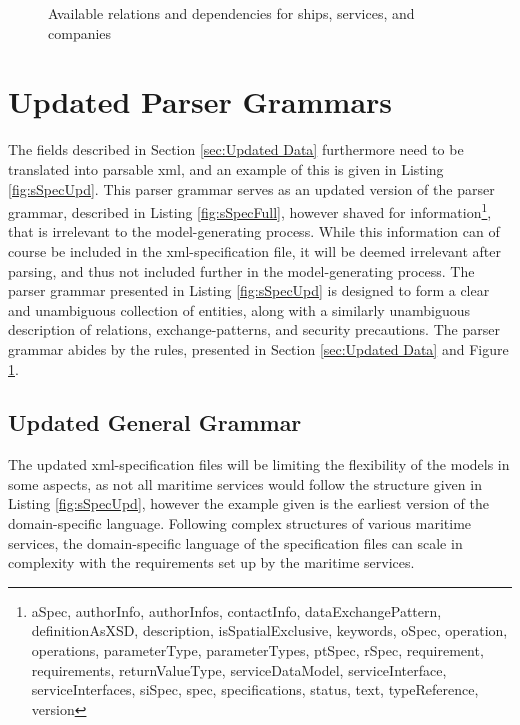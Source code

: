 \begin{figure}
	\caption{Available relations and dependencies for ships, services, and companies}
	\label{fig:entities}
\end{figure}


\section{Updated Parser Grammars}

The fields described in Section \ref{sec:Updated Data} furthermore need to be translated into parsable xml, and an example of this is given in Listing \ref{fig:sSpecUpd}. This parser grammar serves as an updated version of the parser grammar, described in Listing \ref{fig:sSpecFull}, however shaved for information\footnote{aSpec, authorInfo, authorInfos, contactInfo, dataExchangePattern, definitionAsXSD, description, isSpatialExclusive, keywords, oSpec, operation, operations, parameterType, parameterTypes, ptSpec, rSpec, requirement, requirements, returnValueType, serviceDataModel, serviceInterface, serviceInterfaces, siSpec, spec, specifications, status, text, typeReference, version}, that is irrelevant to the model-generating process. While this information can of course be included in the xml-specification file, it will be deemed irrelevant after parsing, and thus not included further in the model-generating process. The parser grammar presented in Listing \ref{fig:sSpecUpd} is designed to form a clear and unambiguous collection of entities, along with a similarly unambiguous description of relations, exchange-patterns, and security precautions. The parser grammar abides by the rules, presented in Section \ref{sec:Updated Data} and Figure \ref{fig:entities}.

\subsection{Updated General Grammar}
The updated xml-specification files will be limiting the flexibility of the models in some aspects, as not all maritime services would follow the structure given in Listing \ref{fig:sSpecUpd}, however the example given is the earliest version of the domain-specific language. Following complex structures of various maritime services, the domain-specific language of the specification files can scale in complexity with the requirements set up by the maritime services.

